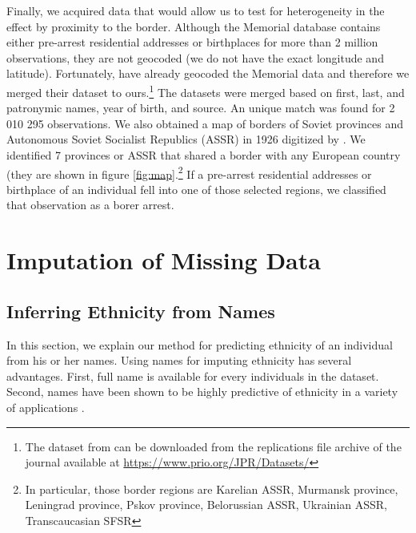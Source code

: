 Finally, we acquired data that would allow us to test for heterogeneity in the effect by proximity to the border. 
Although the Memorial database contains either pre-arrest residential addresses or birthplaces for more than 2 million observations, they are not geocoded (we do not have the exact longitude and latitude). 
Fortunately,  \citet{zhukov_stalins_2018} have already geocoded the Memorial data and therefore we merged their dataset to ours.\footnote{The dataset from \citet{zhukov_stalins_2018} can be  downloaded  from the replications file archive of the journal available  at \url{https://www.prio.org/JPR/Datasets/}} The datasets were merged based on first, last, and patronymic names, year of birth, and source. An unique match was found for 2 010 295 observations. We also obtained a  map of  borders of Soviet provinces and Autonomous Soviet Socialist Republics (ASSR) in 1926 digitized by \citet{sablin_transcultural_2018}. We identified 7  provinces or ASSR that shared a border with any European country (they are shown in figure \ref{fig:map}.\footnote{In particular, those border regions are Karelian ASSR, Murmansk province, Leningrad province, Pskov province, Belorussian ASSR, Ukrainian ASSR, Transcaucasian SFSR} 
 If a pre-arrest residential addresses or birthplace of an individual fell into one of those selected regions, we classified that observation as a borer arrest. 

 






\newpage
\section{Imputation of Missing Data} \label{sec:missing_data}
\subsection{Inferring Ethnicity from Names} \label{subsec:inferring_ethnicity}
In this section, we explain our method for predicting ethnicity of an individual from his or her names. Using names for imputing ethnicity has several advantages. First, full name  is available for every individuals in the dataset. Second, names have been shown to be highly predictive of ethnicity in a variety of applications \citep{mateos_review_2007, hofstra_sources_2017, hofstra_predicting_2018}. 

